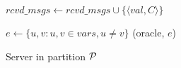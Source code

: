 \begin{algorithm}[h!]
\begin{distribalgo}[1]
\vspace{1.0mm}
    \STATE $rcvd\_msgs \leftarrow rcvd\_msgs \cup \{\langle val, C \rangle\}$
\ENDINDENT

\vspace{1.0mm}
	\STATE $e \leftarrow \{u, v: u,v \in vars, u \neq v\}$
	\STATE \rmcast(oracle, $e$)
\ENDINDENT

\caption{Server in partition $\mathcal{P}$}
\label{alg:server_proxy}
\end{distribalgo}
\end{algorithm}